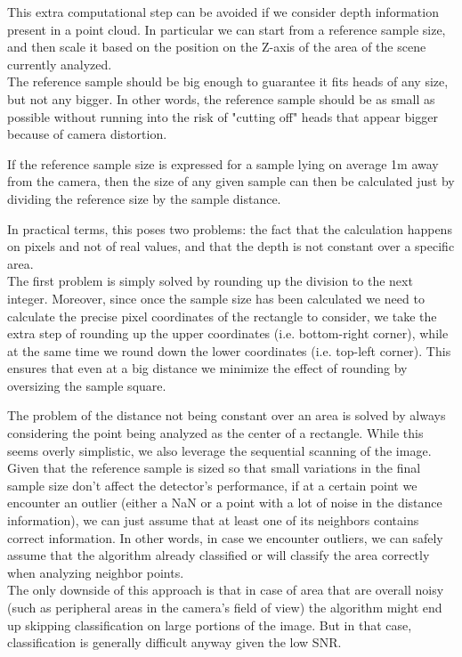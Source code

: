 \documentclass[a4paper,12pt,titlepage]{article}
\begin{document}
This extra computational step can be avoided if we consider depth information
present in a point cloud. In particular we can start from a reference sample
size, and then scale it based on the position on the Z-axis of the area of the
scene currently analyzed. \\
The reference sample should be big enough to guarantee it fits heads of any
size, but not any bigger. In other words, the reference sample should be as
small as possible without running into the risk of "cutting off" heads that
appear bigger because of camera distortion.

If the reference sample size is expressed for a sample lying on average 1m away
from the camera, then the size of any given sample can then be calculated just
by dividing the reference size by the sample distance.

In practical terms, this poses two problems: the fact that the calculation
happens on pixels and not of real values, and that the depth is not constant
over a specific area. \\
The first problem is simply solved by rounding up the division to the next
integer. Moreover, since once the sample size has been calculated we need to
calculate the precise pixel coordinates of the rectangle to consider, we take
the extra step of rounding up the upper coordinates (i.e. bottom-right corner),
while at the same time we round down the lower coordinates (i.e. top-left
corner). This ensures that even at a big distance we minimize the effect of
rounding by oversizing the sample square.

The problem of the distance not being constant over an area is solved by always
considering the point being analyzed as the center of a rectangle. While this
seems overly simplistic, we also leverage the sequential scanning of the image.
Given that the reference sample is sized so that small variations in the final
sample size don't affect the detector's performance, if at a certain point we
encounter an outlier (either a NaN or a point with a lot of noise in the
distance information), we can just assume that at least one of its neighbors
contains correct information. In other words, in case we encounter outliers, we
can safely assume that the algorithm already classified or will classify the
area correctly when analyzing neighbor points. \\
The only downside of this approach is that in case of area that are overall
noisy (such as peripheral areas in the camera's field of view) the algorithm
might end up skipping classification on large portions of the image. But in that
case, classification is generally difficult anyway given the low SNR.
\end{document}
